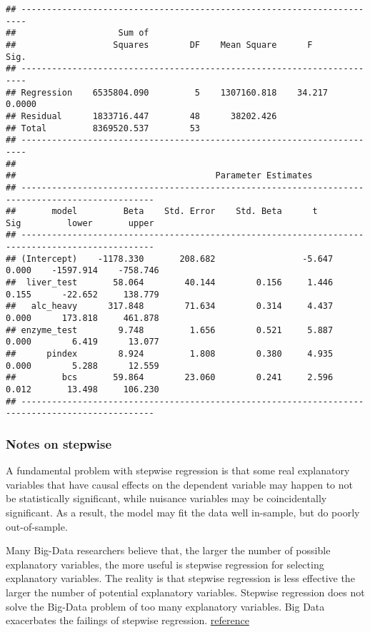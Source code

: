 \documentclass[
]{article}
\begin{document}
\begin{verbatim}
## -----------------------------------------------------------------------
##                    Sum of                                              
##                   Squares        DF    Mean Square      F         Sig. 
## -----------------------------------------------------------------------
## Regression    6535804.090         5    1307160.818    34.217    0.0000 
## Residual      1833716.447        48      38202.426                     
## Total         8369520.537        53                                    
## -----------------------------------------------------------------------
## 
##                                       Parameter Estimates                                        
## ------------------------------------------------------------------------------------------------
##       model         Beta    Std. Error    Std. Beta      t        Sig         lower       upper 
## ------------------------------------------------------------------------------------------------
## (Intercept)    -1178.330       208.682                 -5.647    0.000    -1597.914    -758.746 
##  liver_test       58.064        40.144        0.156     1.446    0.155      -22.652     138.779 
##   alc_heavy      317.848        71.634        0.314     4.437    0.000      173.818     461.878 
## enzyme_test        9.748         1.656        0.521     5.887    0.000        6.419      13.077 
##      pindex        8.924         1.808        0.380     4.935    0.000        5.288      12.559 
##         bcs       59.864        23.060        0.241     2.596    0.012       13.498     106.230 
## ------------------------------------------------------------------------------------------------
\end{verbatim}

\hypertarget{notes-on-stepwise}{%
\subsubsection{Notes on stepwise}\label{notes-on-stepwise}}

A fundamental problem with stepwise regression is that some real
explanatory variables that have causal effects on the dependent variable
may happen to not be statistically significant, while nuisance variables
may be coincidentally significant. As a result, the model may fit the
data well in-sample, but do poorly out-of-sample.

Many Big-Data researchers believe that, the larger the number of
possible explanatory variables, the more useful is stepwise regression
for selecting explanatory variables. The reality is that stepwise
regression is less effective the larger the number of potential
explanatory variables. Stepwise regression does not solve the Big-Data
problem of too many explanatory variables. Big Data exacerbates the
failings of stepwise regression.
\href{https://journalofbigdata.springeropen.com/articles/10.1186/s40537-018-0143-6}{reference}
\end{document}
